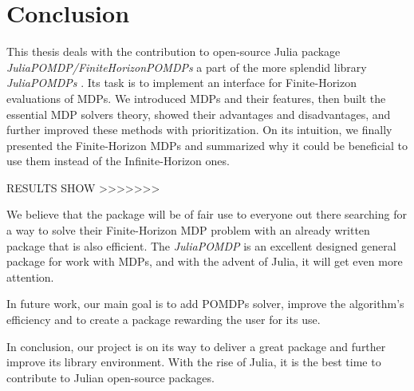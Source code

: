 
\chapter{Conclusion}

This thesis deals with the contribution to open-source Julia package \newline \textit{JuliaPOMDP/FiniteHorizonPOMDPs} \cite{FHPOMDP} a part of the more splendid library \textit{JuliaPOMDPs} \cite{JuliaPOMDP}. Its task is to implement an interface for Finite-Horizon evaluations of MDPs. We introduced MDPs and their features, then built the essential MDP solvers theory, showed their advantages and disadvantages, and further improved these methods with prioritization. On its intuition, we finally presented the Finite-Horizon MDPs and summarized why it could be beneficial to use them instead of the Infinite-Horizon ones. 

RESULTS SHOW >>>>>>>


We believe that the package will be of fair use to everyone out there searching for a way to solve their Finite-Horizon MDP  problem with an already written package that is also efficient. The \textit{JuliaPOMDP} \cite{JuliaPOMDP} is an excellent designed general package for work with MDPs, and with the advent of Julia, it will get even more attention.

In future work, our main goal is to add POMDPs solver, improve the algorithm's efficiency and to create a package rewarding the user for its use.

In conclusion, our project is on its way to deliver a great package and further improve its library environment. With the rise of Julia, it is the best time to contribute to Julian open-source packages.